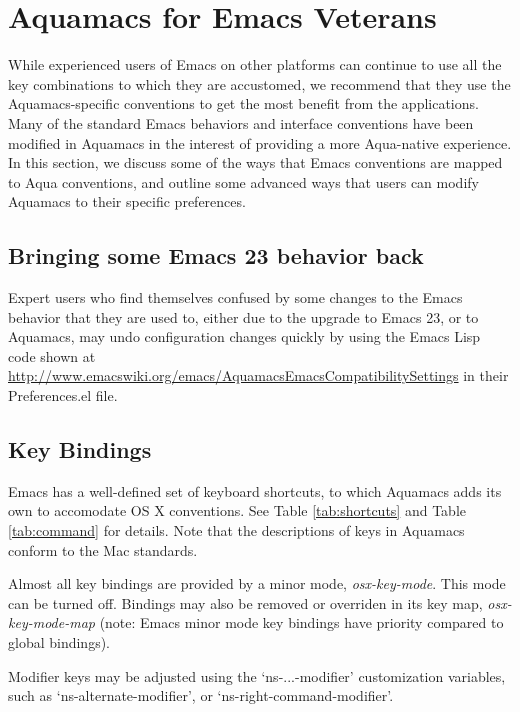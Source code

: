 \documentclass[11pt,letterpaper]{article}
\begin{document}
\section{Aquamacs for Emacs Veterans}

While experienced users of Emacs on other platforms can continue to use all the key combinations to which they are accustomed, we recommend that they use the Aquamacs-specific conventions to get the most benefit from the applications.  Many of the standard Emacs behaviors and interface conventions have been modified in Aquamacs in the interest of providing a more Aqua-native experience. In this section, we discuss some of the ways that Emacs conventions are mapped to Aqua conventions, and outline some advanced ways that users can modify Aquamacs to their specific preferences.

\subsection{Bringing some Emacs 23 behavior back}

Expert users who find themselves confused by some changes to the Emacs behavior that they are used to, either due to the upgrade to Emacs 23, or to Aquamacs, may undo configuration changes quickly by using the Emacs Lisp code shown at \url{http://www.emacswiki.org/emacs/AquamacsEmacsCompatibilitySettings} in their Preferences.el file.

\subsection{Key Bindings}
Emacs has a well-defined set of keyboard shortcuts, to which Aquamacs adds its own to accomodate OS X conventions. See Table \ref{tab:shortcuts} and Table \ref{tab:command} for details.
Note that the descriptions of keys in Aquamacs conform to the Mac standards.

Almost all key bindings are provided by a minor mode, \emph{osx-key-mode}.  This mode can be turned off.  Bindings may also be removed or overriden in its key map, \emph{osx-key-mode-map} (note: Emacs minor mode key bindings have priority compared to global bindings).

Modifier keys may be adjusted using the `ns-...-modifier' customization variables, such as `ns-alternate-modifier', or `ns-right-command-modifier'.
\end{document}
